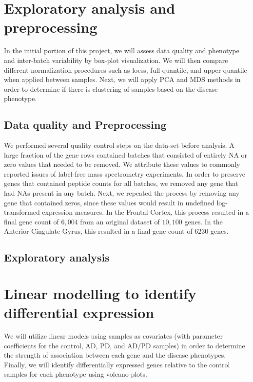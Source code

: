\section{Exploratory analysis and preprocessing}
\label{sec:expl-analys-prepr}

 In the initial portion of this project, we will assess data quality and phenotype and  inter-batch variability by box-plot visualization. We will then compare different normalization procedures such as loess, full-quantile, and upper-quantile when applied between samples. Next, we will apply PCA and MDS methods in order to determine if there is clustering of samples based on the disease phenotype.


\subsection{Data quality and Preprocessing}
\label{subsec:data-qual-vari}

We performed several quality control steps on the data-set before analysis. A large fraction of the gene rows contained batches that consisted of entirely NA or zero values that needed to be removed. We attribute these values to commonly reported issues of label-free mass spectrometry experiments. In order to preserve genes that contained peptide counts for all batches, we removed any gene that had NAs present in any batch. Next, we repeated the process by removing any gene that contained zeros, since these values would result in undefined log-transformed expression measures. In the Frontal Cortex, this process resulted in a final gene count of $6,004$ from an original dataset of $10,100$ genes. In the Anterior Cingulate Gyrus, this resulted in a final gene count of $6230$ genes. 

\subsection{Exploratory analysis}
\label{subsec:exploratory-analysis}



\section{Linear modelling to identify differential expression}
\label{sec:line-modell-ident}

We will utilize linear models using samples as covariates (with parameter coefficients for the control, AD, PD, and AD/PD samples) in order to determine the strength of association between each gene and the disease phenotypes. Finally, we will identify differentially expressed genes relative to the control samples for each phenotype using  volcano-plots.


